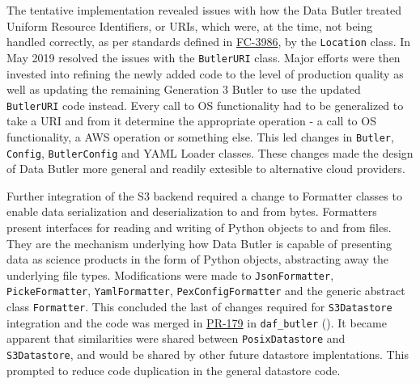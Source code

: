 The tentative implementation revealed issues with how the Data Butler treated Uniform Resource Identifiers, or URIs, which were, at the time, not being handled correctly, as per standards defined in \href{https://tools.ietf.org/html/rfc3986}{FC-3986}, by the \texttt{Location} class.
In May 2019  resolved the issues with the \texttt{ButlerURI} class.
Major efforts were then invested into refining the newly added code to the level of production quality as well as updating the remaining Generation 3 Butler to use the updated \texttt{ButlerURI} code instead.
Every call to OS functionality had to be generalized to take a URI and from it determine the appropriate operation - a call to OS functionality, a AWS operation or something else.
This led changes in \texttt{Butler}, \texttt{Config}, \texttt{ButlerConfig} and YAML Loader classes.
These changes made the design of Data Butler more general and readily extesible to alternative cloud providers.

Further integration of the S3 backend required a change to Formatter classes to enable data serialization and deserialization to and from bytes.
Formatters present interfaces for reading and writing of Python objects to and from files.
They are the mechanism underlying how Data Butler is capable of presenting data as science products in the form of Python objects, abstracting away the underlying file types.
Modifications were made to \texttt{JsonFormatter}, \texttt{PickeFormatter}, \texttt{YamlFormatter}, \texttt{PexConfigFormatter} and the generic abstract class \texttt{Formatter}.
This concluded the last of changes required for \texttt{S3Datastore} integration and the code was merged in \href{https://github.com/lsst/daf_butler/pull/179}{PR-179} in \texttt{daf\_butler} ().
It became apparent that similarities were shared between \texttt{PosixDatastore} and \texttt{S3Datastore}, and would be shared by other future datastore implentations.
This prompted  to reduce code duplication in the general datastore code.

